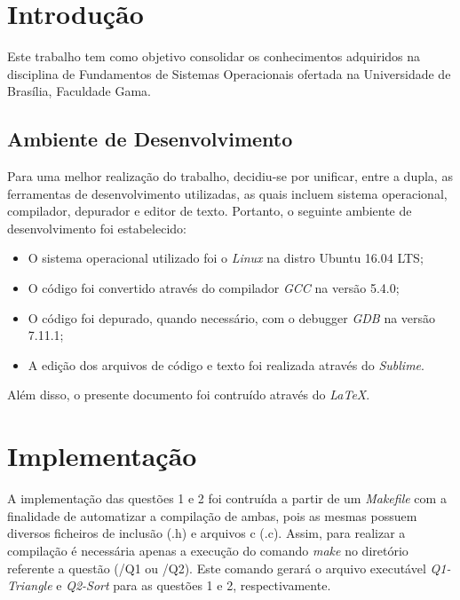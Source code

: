 \chapter[Introdução]{Introdução}

	Este trabalho tem como objetivo consolidar os conhecimentos adquiridos na disciplina de Fundamentos de Sistemas
	Operacionais ofertada na Universidade de Brasília, Faculdade Gama.

\section{Ambiente de Desenvolvimento}

	Para uma melhor realização do trabalho, decidiu-se por unificar, entre a dupla, as ferramentas de desenvolvimento
	utilizadas, as quais incluem sistema operacional, compilador, depurador e editor de texto. Portanto, o seguinte
	ambiente de desenvolvimento foi estabelecido:

	\begin{itemize}

		\item O sistema operacional utilizado foi o \textit{Linux} na distro Ubuntu 16.04 LTS;
		\item O código foi convertido através do compilador \textit{GCC} na versão 5.4.0;
		\item O código foi depurado, quando necessário, com o debugger \textit{GDB} na versão 7.11.1;
		\item A edição dos arquivos de código e texto foi realizada através do \textit{Sublime}.

	\end{itemize}

	Além disso, o presente documento foi contruído através do \textit{LaTeX}.

	\chapter[Implementação]{Implementação}

  A implementação das questões 1 e 2 foi contruída a partir de um \textit{Makefile} com a finalidade de automatizar a
  compilação de ambas, pois as mesmas possuem diversos ficheiros de inclusão (.h) e arquivos c (.c). Assim, para
  realizar a compilação é necessária apenas a execução do comando \textit{make} no diretório referente a questão
  (/Q1 ou /Q2). Este comando gerará o arquivo executável \textit{Q1-Triangle} e \textit{Q2-Sort} para as questões 1 e 2,
  respectivamente.

